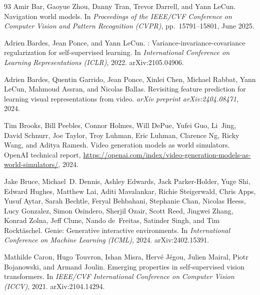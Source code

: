 \begin{thebibliography}{93}
Amir Bar, Gaoyue Zhou, Danny Tran, Trevor Darrell, and Yann LeCun.
\newblock Navigation world models.
\newblock In \emph{Proceedings of the IEEE/CVF Conference on Computer Vision
  and Pattern Recognition (CVPR)}, pp.\  15791--15801, June 2025.

Adrien Bardes, Jean Ponce, and Yann LeCun.
: Variance-invariance-covariance regularization for
  self-supervised learning.
\newblock In \emph{International Conference on Learning Representations
  (ICLR)}, 2022.
\newblock arXiv:2105.04906.

Adrien Bardes, Quentin Garrido, Jean Ponce, Xinlei Chen, Michael Rabbat, Yann
  LeCun, Mahmoud Assran, and Nicolas Ballas.
\newblock Revisiting feature prediction for learning visual representations
  from video.
\newblock \emph{arXiv preprint arXiv:2404.08471}, 2024.

Tim Brooks, Bill Peebles, Connor Holmes, Will DePue, Yufei Guo, Li~Jing, David
  Schnurr, Joe Taylor, Troy Luhman, Eric Luhman, Clarence Ng, Ricky Wang, and
  Aditya Ramesh.
\newblock Video generation models as world simulators.
\newblock OpenAI technical report,
  \url{https://openai.com/index/video-generation-models-as-world-simulators/},
  2024.

Jake Bruce, Michael~D. Dennis, Ashley Edwards, Jack Parker-Holder, Yuge Shi,
  Edward Hughes, Matthew Lai, Aditi Mavalankar, Richie Steigerwald, Chris Apps,
  Yusuf Aytar, Sarah Bechtle, Feryal Behbahani, Stephanie Chan, Nicolas Heess,
  Lucy Gonzalez, Simon Osindero, Sherjil Ozair, Scott Reed, Jingwei Zhang,
  Konrad Zolna, Jeff Clune, Nando de~Freitas, Satinder Singh, and Tim
  Rockt{\"a}schel.
\newblock Genie: Generative interactive environments.
\newblock In \emph{International Conference on Machine Learning (ICML)}, 2024.
\newblock arXiv:2402.15391.

Mathilde Caron, Hugo Touvron, Ishan Misra, Herv{\'e} J{\'e}gou, Julien Mairal,
  Piotr Bojanowski, and Armand Joulin.
\newblock Emerging properties in self-supervised vision transformers.
\newblock In \emph{IEEE/CVF International Conference on Computer Vision
  (ICCV)}, 2021.
\newblock arXiv:2104.14294.


\end{thebibliography}
